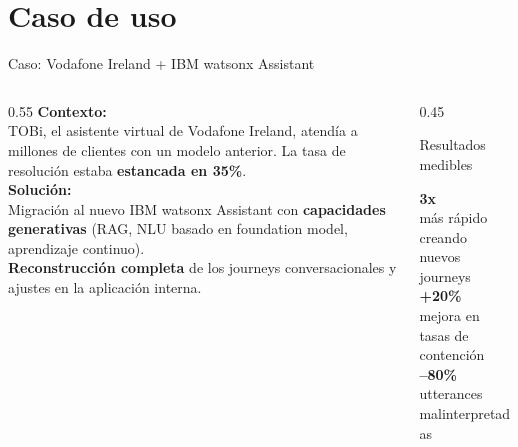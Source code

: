 \documentclass[10pt,aspectratio=169]{beamer}
\begin{document}
\section{Caso de uso}
\begin{frame}{Caso: Vodafone Ireland + IBM watsonx Assistant}
    \begin{columns}[T]
        \begin{column}{0.55\textwidth}
            \textbf{Contexto:}\\
            TOBi, el asistente virtual de Vodafone Ireland, atendía a millones de clientes con un modelo anterior. La tasa de resolución estaba \textbf{estancada en 35\%}.\\[0.3cm]
            \textbf{Solución:}\\
            Migración al nuevo IBM watsonx Assistant con \textbf{capacidades generativas} (RAG, NLU basado en foundation model, aprendizaje continuo).\\[0.3cm]
            \textbf{Reconstrucción completa} de los journeys conversacionales y ajustes en la aplicación interna.
        \end{column}
        \begin{column}{0.45\textwidth}
            \begin{alertblock}{Resultados medibles}
                \begin{center}
                {\Huge\color{acento}\textbf{3x}}\\[0.2cm]
                \small más rápido creando nuevos journeys\\[0.4cm]
                {\Huge\color{acento}\textbf{+20\%}}\\[0.2cm]
                \small mejora en tasas de contención\\[0.4cm]
                {\Huge\color{verdeExito}\textbf{--80\%}}\\[0.2cm]
                \small utterances malinterpretadas
                \end{center}
            \end{alertblock}
        \end{column}
    \end{columns}
\end{frame}

\end{document}
